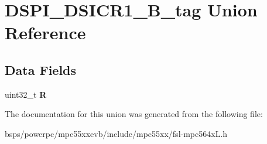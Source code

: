 \hypertarget{unionDSPI__DSICR1__32B__tag}{}\section{D\+S\+P\+I\+\_\+\+D\+S\+I\+C\+R1\+\_\+B\+\_\+tag Union Reference}
\label{unionDSPI__DSICR1__32B__tag}
\subsection*{Data Fields}
\begin{DoxyCompactItemize}
\item 
\mbox{\label{unionDSPI__DSICR1__32B__tag_a14c4a964d6a63530ea07650637651dba}} 
uint32\+\_\+t {\bfseries R}
\end{DoxyCompactItemize}


The documentation for this union was generated from the following file\+:\begin{DoxyCompactItemize}
\item 
bsps/powerpc/mpc55xxevb/include/mpc55xx/fsl-\/mpc564x\+L.\+h\end{DoxyCompactItemize}
